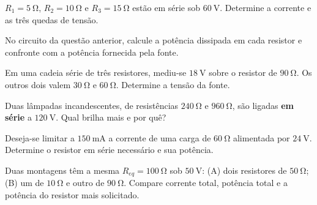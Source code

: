 \blocoaplicacao
\begin{questao}[2]{}

$R_1=\SI{5}{\ohm}$, $R_2=\SI{10}{\ohm}$ e $R_3=\SI{15}{\ohm}$ estão em série
sob $\SI{60}{\volt}$. Determine a corrente e as três quedas de tensão.


\end{questao}
\begin{questao}[2]{}

No circuito da questão anterior, calcule a potência dissipada em cada resistor
e confronte com a potência fornecida pela fonte.


\end{questao}
\begin{questao}[2]{}

Em uma cadeia série de três resistores, mediu-se $\SI{18}{\volt}$ sobre o
resistor de $\SI{90}{\ohm}$. Os outros dois valem $\SI{30}{\ohm}$ e
$\SI{60}{\ohm}$. Determine a tensão da fonte.


\end{questao}
\begin{questao}[2]{}

Duas lâmpadas incandescentes, de resistências $\SI{240}{\ohm}$ e
$\SI{960}{\ohm}$, são ligadas \textbf{em série} a $\SI{120}{\volt}$. Qual
brilha mais e por quê?


\end{questao}
\begin{questao}[2]{}

Deseja-se limitar a $\SI{150}{\milli\ampere}$ a corrente de uma carga de
$\SI{60}{\ohm}$ alimentada por $\SI{24}{\volt}$. Determine o resistor em série
necessário e sua potência.


\end{questao}
\begin{questao}[2]{}

Duas montagens têm a mesma $R_{eq}=\SI{100}{\ohm}$ sob $\SI{50}{\volt}$:
(A) dois resistores de $\SI{50}{\ohm}$; (B) um de $\SI{10}{\ohm}$ e outro de
$\SI{90}{\ohm}$. Compare corrente total, potência total e a potência do
resistor mais solicitado.


\end{questao}
